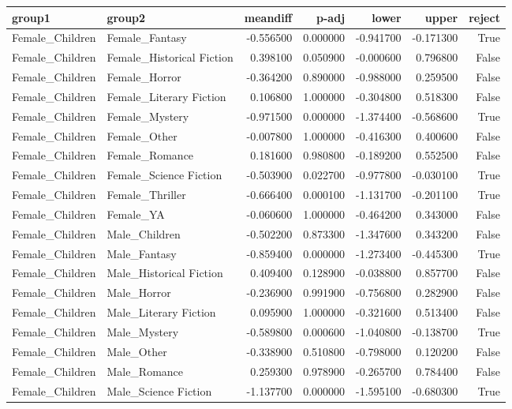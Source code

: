 \begin{tabular}{llrrrrr}
\toprule
group1 & group2 & meandiff & p-adj & lower & upper & reject \\
\midrule
Female_Children & Female_Fantasy & -0.556500 & 0.000000 & -0.941700 & -0.171300 & True \\
Female_Children & Female_Historical Fiction & 0.398100 & 0.050900 & -0.000600 & 0.796800 & False \\
Female_Children & Female_Horror & -0.364200 & 0.890000 & -0.988000 & 0.259500 & False \\
Female_Children & Female_Literary Fiction & 0.106800 & 1.000000 & -0.304800 & 0.518300 & False \\
Female_Children & Female_Mystery & -0.971500 & 0.000000 & -1.374400 & -0.568600 & True \\
Female_Children & Female_Other & -0.007800 & 1.000000 & -0.416300 & 0.400600 & False \\
Female_Children & Female_Romance & 0.181600 & 0.980800 & -0.189200 & 0.552500 & False \\
Female_Children & Female_Science Fiction & -0.503900 & 0.022700 & -0.977800 & -0.030100 & True \\
Female_Children & Female_Thriller & -0.666400 & 0.000100 & -1.131700 & -0.201100 & True \\
Female_Children & Female_YA & -0.060600 & 1.000000 & -0.464200 & 0.343000 & False \\
Female_Children & Male_Children & -0.502200 & 0.873300 & -1.347600 & 0.343200 & False \\
Female_Children & Male_Fantasy & -0.859400 & 0.000000 & -1.273400 & -0.445300 & True \\
Female_Children & Male_Historical Fiction & 0.409400 & 0.128900 & -0.038800 & 0.857700 & False \\
Female_Children & Male_Horror & -0.236900 & 0.991900 & -0.756800 & 0.282900 & False \\
Female_Children & Male_Literary Fiction & 0.095900 & 1.000000 & -0.321600 & 0.513400 & False \\
Female_Children & Male_Mystery & -0.589800 & 0.000600 & -1.040800 & -0.138700 & True \\
Female_Children & Male_Other & -0.338900 & 0.510800 & -0.798000 & 0.120200 & False \\
Female_Children & Male_Romance & 0.259300 & 0.978900 & -0.265700 & 0.784400 & False \\
Female_Children & Male_Science Fiction & -1.137700 & 0.000000 & -1.595100 & -0.680300 & True \\

\end{tabular}
